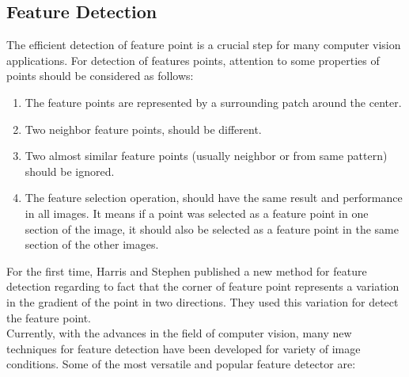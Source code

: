 \subsection{Feature Detection} \label{subsec:feature_detection}
 The efficient detection of feature point is a crucial step for many computer vision applications. For detection of features points, attention to some properties of points should be considered as follows: \cite{forstner1986feature}
\begin{enumerate}
  \item The feature points are represented by a surrounding patch around the center.
  \item Two neighbor feature points, should be different.
  \item Two almost similar feature points (usually neighbor or from same pattern) should be ignored.
  \item The feature selection operation, should have the same result and performance in all images. It means if a point was selected as a feature point in one section of the image, it should also be selected as a feature point in the same section of the other images.
\end{enumerate}
For the first time, Harris and Stephen \cite{harris1988combined} published a new method for feature detection regarding to fact that the corner of feature point represents a variation in the gradient of the point in two directions. They used this variation for detect the feature point.\\
Currently, with the advances in the field of computer vision, many new techniques for feature detection have been developed for variety of image conditions. Some of the most versatile and popular feature detector are:
